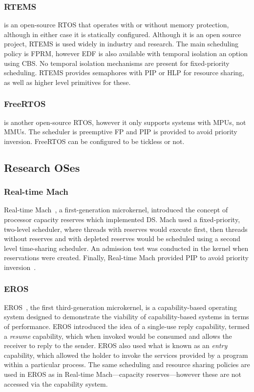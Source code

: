 \subsubsection{RTEMS}

\citet{RTEMS:URL} is an open-source \gls{RTOS} that operates with or without
memory protection, although in either case it is statically configured.  Although it is an open
source project, RTEMS is used widely in industry and research.  The main scheduling policy is
\gls{FPRM}, however \gls{EDF} is also available with temporal isolation an option using \gls{CBS}.
No temporal isolation mechanisms are present for fixed-priority scheduling.  RTEMS provides
semaphores with \gls{PIP} or \gls{HLP} for resource sharing, as well as
higher level primitives for these. 

\subsubsection{FreeRTOS}

\citet{FreeRTOS:URL} is another open-source \gls{RTOS}, however it only supports systems with \glspl{MPU}, not
\glspl{MMU}. The scheduler is preemptive \gls{FP} and \gls{PIP} is provided to avoid priority inversion.
FreeRTOS can be configured to be tickless or not.

\subsection{Research OSes}

\subsubsection{Real-time Mach}

Real-time Mach~\citep{Mercer_RZ_94, Mercer_ST_93}, a first-generation microkernel, introduced the concept of
processor capacity reserves which implemented \gls{DS}. Mach used a fixed-priority, two-level 
scheduler, where threads with reserves would execute first, then threads without reserves and with
depleted reserves would be scheduled using a second level time-sharing scheduler.
An admission test was conducted in the kernel when reservations were created. 
Finally, Real-time Mach provided \gls{PIP} to avoid priority inversion~\citep{Tokuda_NR_90}.

\subsubsection{EROS}
EROS~\citep{Shapiro_SF_99}, the first third-generation microkernel, is a capability-based operating system
designed to
demonstrate the viability of capability-based systems in terms of performance.  EROS introduced the
idea of a single-use reply capability, termed a \emph{resume} capability, which when invoked would
be consumed and allows the receiver to reply to the sender.  EROS also used what is known as an
\emph{entry} capability, which allowed the holder to invoke the services provided by a program
within a particular process. The same scheduling and resource sharing policies are used in EROS as
in Real-time Mach---capacity reserves---however these are not accessed via the capability system.

